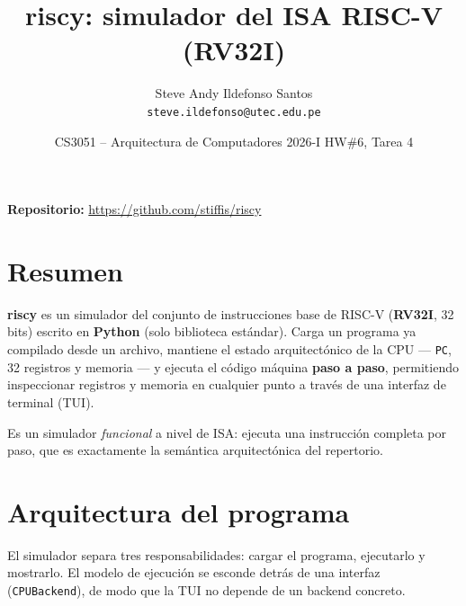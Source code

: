 \documentclass[11pt]{article}
\title{\vspace{-1.2cm}\textbf{riscy}: simulador del ISA RISC-V (RV32I)}
\author{Steve Andy Ildefonso Santos \\ \texttt{steve.ildefonso@utec.edu.pe}}
\date{CS3051 -- Arquitectura de Computadores 2026-I \quad\textbar\quad HW\#6, Tarea 4}
\begin{document}
\maketitle
\vspace{-0.6cm}

\noindent\textbf{Repositorio:} \url{https://github.com/stiffis/riscy}

\section{Resumen}

\textbf{riscy} es un simulador del conjunto de instrucciones base de RISC-V
(\textbf{RV32I}, 32 bits) escrito en \textbf{Python} (solo biblioteca estándar).
Carga un programa ya compilado desde un archivo, mantiene el estado
arquitectónico de la CPU --- \texttt{PC}, 32 registros y memoria --- y ejecuta el
código máquina \textbf{paso a paso}, permitiendo inspeccionar registros y memoria
en cualquier punto a través de una interfaz de terminal (TUI).

Es un simulador \emph{funcional} a nivel de ISA: ejecuta una instrucción completa
por paso, que es exactamente la semántica arquitectónica del repertorio.

\section{Arquitectura del programa}

El simulador separa tres responsabilidades: cargar el programa, ejecutarlo y
mostrarlo. El modelo de ejecución se esconde detrás de una interfaz
(\texttt{CPUBackend}), de modo que la TUI no depende de un backend concreto.

\begin{center}
\end{center}
\end{document}
